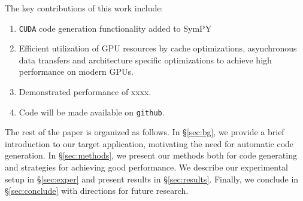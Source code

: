   The key contributions of this work include:

\begin{enumerate}
\item \texttt{CUDA} code generation functionality added to SymPY
\item Efficient utilization of GPU resources by cache optimizations, asynchronous data transfers and architecture specific optimizations to achieve high performance on modern GPUs.
\item Demonstrated performance of xxxx. 
\item Code will be made available on \texttt{github}.
\end{enumerate}

The rest of the paper is organized as follows. In \S\ref{sec:bg}, we provide a brief introduction to our target application, motivating the need for automatic code generation. In \S\ref{sec:methods}, we present our methods both for code generating and strategies for achieving good performance. We describe our experimental setup in \S\ref{sec:exper} and present results in \S\ref{sec:results}. Finally, we conclude in \S\ref{sec:conclude} with directions for future research. 



